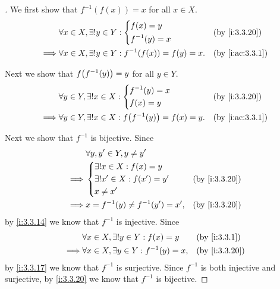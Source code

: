 \begin{proof}[]
  We first show that \(f^{-1}(f(x)) = x\) for all \(x \in X\).
  \begin{align*}
             & \forall x \in X, \exists! y \in Y : \begin{dcases}
                                                     f(x) = y \\
                                                     f^{-1}(y) = x
                                                   \end{dcases}              &  & \by{i:3.3.20}     \\
    \implies & \forall x \in X, \exists! y \in Y : f^{-1}\pa{f(x)} = f(y) = x. &  & \by{i:ac:3.3.1}
  \end{align*}

  Next we show that \(f\pa{f^{-1}(y)} = y\) for all \(y \in Y\).
  \begin{align*}
             & \forall y \in Y, \exists! x \in X : \begin{dcases}
                                                     f^{-1}(y) = x \\
                                                     f(x) = y
                                                   \end{dcases}              &  & \by{i:3.3.20}     \\
    \implies & \forall y \in Y, \exists! x \in X : f\pa{f^{-1}(y)} = f(x) = y. &  & \by{i:ac:3.3.1}
  \end{align*}

  Next we show that \(f^{-1}\) is bijective.
  Since
  \begin{align*}
             & \forall y, y' \in Y, y \neq y'                         \\
    \implies & \begin{dcases}
                 \exists! x \in X : f(x) = y    \\
                 \exists! x' \in X : f(x') = y' \\
                 x \neq x'
               \end{dcases}   &  & \by{i:3.3.20}                      \\
    \implies & x = f^{-1}(y) \neq f^{-1}(y') = x', &  & \by{i:3.3.20}
  \end{align*}
  by \cref{i:3.3.14} we know that \(f^{-1}\) is injective.
  Since
  \begin{align*}
             & \forall x \in X, \exists! y \in Y : f(x) = y      &  & \by{i:3.3.1}  \\
    \implies & \forall x \in X, \exists y \in Y : f^{-1}(y) = x, &  & \by{i:3.3.20}
  \end{align*}
  by \cref{i:3.3.17} we know that \(f^{-1}\) is surjective.
  Since \(f^{-1}\) is both injective and surjective, by \cref{i:3.3.20} we know that \(f^{-1}\) is bijective.


\end{proof}

